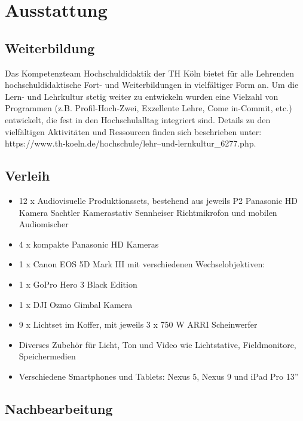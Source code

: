 \chapter{Ausstattung}\label{ausstattung}

\section{Weiterbildung}\label{weiterbildung}

Das Kompetenzteam Hochschuldidaktik der TH Köln bietet für alle
Lehrenden hochschuldidaktische Fort- und Weiterbildungen in vielfältiger
Form an. Um die Lern- und Lehrkultur stetig weiter zu entwickeln wurden
eine Vielzahl von Programmen (z.B. Profil-Hoch-Zwei, Exzellente Lehre,
Come in-Commit, etc.) entwickelt, die fest in den Hochschulalltag
integriert sind. Details zu den vielfältigen Aktivitäten und Ressourcen
finden sich beschrieben unter:
https://www.th-koeln.de/hochschule/lehr--und-lernkultur\_6277.php.

\section{Verleih}\label{verleih}

\begin{itemize}
\tightlist
\item
  12 x Audiovisuelle Produktionssets, bestehend aus jeweils P2 Panasonic
  HD Kamera Sachtler Kamerastativ Sennheiser Richtmikrofon und mobilen
  Audiomischer
\item
  4 x kompakte Panasonic HD Kameras
\item
  1 x Canon EOS 5D Mark III mit verschiedenen Wechselobjektiven:
\item
  1 x GoPro Hero 3 Black Edition
\item
  1 x DJI Ozmo Gimbal Kamera
\item
  9 x Lichtset im Koffer, mit jeweils 3 x 750 W ARRI Scheinwerfer
\item
  Diverses Zubehör für Licht, Ton und Video wie Lichtstative,
  Fieldmonitore, Speichermedien
\item
  Verschiedene Smartphones und Tablets: Nexus 5, Nexus 9 und iPad Pro
  13''
\end{itemize}

\section{Nachbearbeitung}\label{nachbearbeitung}

